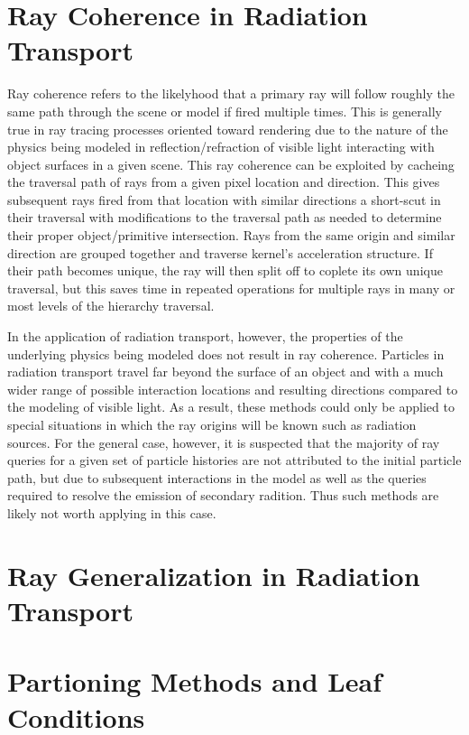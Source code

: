 \documentclass[10pt, a4paper]{article}
\begin{document}
\section{Ray Coherence in Radiation Transport}

Ray coherence refers to the likelyhood that a primary ray will follow roughly the same path through the scene or model if fired multiple times. This is generally true in ray tracing processes oriented toward rendering due to the nature of the physics being modeled in reflection/refraction of visible light interacting with object surfaces in a given scene. This ray coherence can be exploited by cacheing the traversal path of rays from a given pixel location and direction. This gives subsequent rays fired from that location with similar directions a short-scut in their traversal with modifications to the traversal path as needed to determine their proper object/primitive intersection. Rays from the same origin and similar direction are grouped together and traverse kernel's acceleration structure. If their path becomes unique, the ray will then split off to coplete its own unique traversal, but this saves time in repeated operations for multiple rays in many or most levels of the hierarchy traversal.

In the application of radiation transport, however, the properties of the underlying physics being modeled does not result in ray coherence. Particles in radiation transport travel far beyond the surface of an object and with a much wider range of possible interaction locations and resulting directions compared to the modeling of visible light. As a result, these methods could only be applied to special situations in which the ray origins will be known such as radiation sources. For the general case, however, it is suspected that the majority of ray queries for a given set of particle histories are not attributed to the initial particle path, but due to subsequent interactions in the model as well as the queries required to resolve the emission of secondary radition. Thus such methods are likely not worth applying in this case.

\section{Ray Generalization in Radiation Transport}



\section{Partioning Methods and Leaf Conditions}
\end{document}
